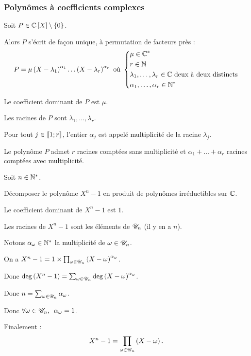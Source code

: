 \subsubsection{Polynômes à coefficients complexes}

\begin{theo}
Soit \(P\in\poly[\C]\excluant\accol{0}\).

Alors \(P\) s'écrit de façon unique, à permutation de facteurs près : \[P=\mu\left(X-\lambda_1\right)^{\alpha_1}\dots\left(X-\lambda_r\right)^{\alpha_r}\text{ où }\begin{dcases}\mu\in\mathbb{C}^* \\ r\in\mathbb{N} \\ \lambda_1,\dots,\lambda_r\in\mathbb{C}\text{ deux à deux distincts} \\ \alpha_1,\dots,\alpha_r\in\mathbb{N}^*\end{dcases}\]

Le coefficient dominant de \(P\) est \(\mu\).

Les racines de \(P\) sont \(\lambda_1,\dots,\lambda_r\).

Pour tout \(j\in\left\llbracket1;r\right\rrbracket\), l'entier \(\alpha_j\) est appelé multiplicité de la racine \(\lambda_j\).

Le polynôme \(P\) admet \(r\) racines comptées sans multiplicité et \(\alpha_1+\dots+\alpha_r\) racines comptées avec multiplicité.
\end{theo}

\begin{exo}[À retenir]
Soit \(n\in\mathbb{N}^*\).

Décomposer le polynôme \(X^n-1\) en produit de polynômes irréductibles sur \(\mathbb{C}\).
\end{exo}

\begin{corr}
Le coefficient dominant de \(X^n-1\) est \(1\).

Les racines de \(X^n-1\) sont les éléments de \(\mathscr{U}_n\) (il y en a \(n\)).

Notons \(\alpha_\omega\in\mathbb{N}^*\) la multiplicité de \(\omega\in\mathscr{U}_n\).

On a \(X^n-1=1\times\prod_{\omega\in\mathscr{U}_n}\left(X-\omega\right)^{\alpha_\omega}\).

Donc \(\deg\left(X^n-1\right)=\sum_{\omega\in\mathscr{U}_n}\deg\left(X-\omega\right)^{\alpha_\omega}\).

Donc \(n=\sum_{\omega\in\mathscr{U}_n}\alpha_\omega\).

Donc \(\quantifs{\forall\omega\in\U_n}\alpha_\omega=1\).

Finalement : \[X^n-1=\prod_{\omega\in\mathscr{U}_n}\left(X-\omega\right).\]
\end{corr}

